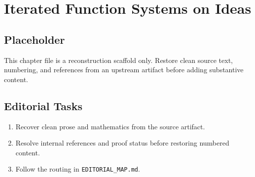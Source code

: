 \chapter{Iterated Function Systems on Ideas}
\label{chap:iterated-function-systems-on-ideas}

\section*{Placeholder}
This chapter file is a reconstruction scaffold only. Restore clean source text, numbering, and references from an upstream artifact before adding substantive content.

\section*{Editorial Tasks}
\begin{enumerate}
\item Recover clean prose and mathematics from the source artifact.
\item Resolve internal references and proof status before restoring numbered content.
\item Follow the routing in \texttt{EDITORIAL\_MAP.md}.
\end{enumerate}

